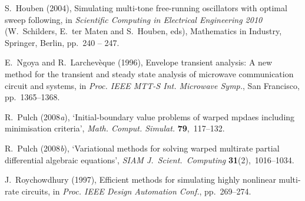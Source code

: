 \documentclass{siamltex}
\begin{document}
\begin{thebibliography}{xx}
S.~Houben  (2004), Simulating multi-tone free-running oscillators with optimal
  sweep following, in {\em Scientific Computing in Electrical Engineering 2010}
  (W.~Schilders, E.~{ter Maten} and S.~Houben, eds), Mathematics in Industry,
  Springer, Berlin, pp.~240 -- 247.

E.~Ngoya and R.~Larchev\`eque  (1996), Envelope transient analysis: {A} new
  method for the transient and steady state analysis of microwave communication
  circuit and systems, in {\em Proc. IEEE MTT-S Int. Microwave Symp.}, San
  Francisco, pp.~1365--1368.

R.~Pulch  (2008{\em a}), `Initial-boundary value problems of warped mpdaes
  including minimisation criteria', {\em Math. Comput. Simulat.} {\bf
  79},~117--132.

R.~Pulch  (2008{\em b}), `Variational methods for solving warped multirate
  partial differential algebraic equations', {\em SIAM J.\ Scient.\ Computing}
  {\bf 31}(2),~1016--1034.

J.~Roychowdhury  (1997), Efficient methods for simulating highly nonlinear
  multi-rate circuits, in {\em Proc. IEEE Design Automation Conf.},
  pp.~269--274.

\end{thebibliography}
\end{document}
